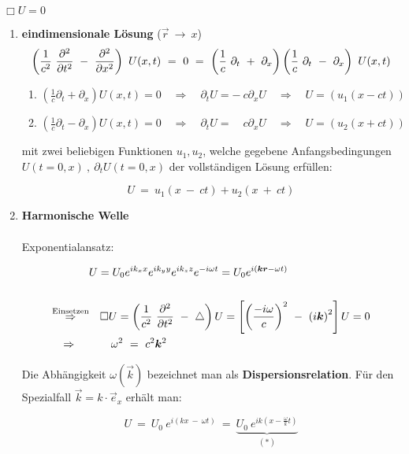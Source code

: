$\Box U = 0$

\begin{enumerate}[label=\textbf{\arabic* .}]
\item \textbf{eindimensionale Lösung} ($\vec{r}\  \rightarrow \ x$)
\begin{equation*}
\left(\frac{1}{c^2} \ \pddiff{}{t} \ - \ \pddiff{}{x}\right)\ U(x,t) \ = \ 0 \ = \ \left(\frac{1}{c}\ \partial_t \ + \ \partial_x\right)\left(\frac{1}{c} \ \partial_t \ - \ \partial_x\right) \ U(x,t)
\end{equation*}

\begin{enumerate}
\item $\left(\frac{1}{c}\partial_t+\partial_x\right)U(x,t) = 0 \quad\Rightarrow\quad \partial_t U = - \ c \partial_x U \quad\Rightarrow\quad U = (u_1(x-ct))$
\item $\left(\frac{1}{c}\partial_t-\partial_x\right)U(x,t) = 0 \quad\Rightarrow\quad \partial_t U =\quad c \partial_x U \quad\Rightarrow\quad U = (u_2(x+ct))$
\end{enumerate}

mit zwei beliebigen Funktionen $u_1,u_2$, welche gegebene Anfangsbedingungen $U(t=0,x) \ , \ \partial_t U(t=0,x)$ der vollständigen Lösung erfüllen:

\begin{equation*}
U \ = \ u_1(x\ -\ ct) + u_2(x\ +\ ct)
\end{equation*}

\item
\textbf{Harmonische Welle}\\
\ \\
Exponentialansatz:

\begin{align*}
& U=U_0 e^{ik_x x}e^{ik_y y}e^{ik_z z}e^{-i\omega t} = U_0 e^{i(\vec{k}\vec{r}-\omega
t)}\\
\ \\
\overset{\text{Einsetzen}}{\Rightarrow} &\quad\Box U = \left(\frac{1}{c^2} \ \pddiff{}{t} \ - \ \bigtriangleup\right)U = \left[\left(\frac{-i\omega}{c}\right)^2 \ - \ \left(i\vec{k}\right)^2\right]U = 0\\
\Rightarrow \ \quad&\qquad \omega^2 \ = \ c^2 \vec{k}^2
\end{align*}

Die Abhängigkeit $\omega(\vec{k})$ bezeichnet man als \textbf{Dispersionsrelation}. Für den Spezialfall $\vec{k} = k \cdot \vec{e}_x$ erhält man:

\begin{equation*}
U \ = \ U_0 \ e^{i(kx \ - \ \omega t)} \ = \ \underbrace{U_0 \ e^{ik\left(x-\frac{\omega}{k}t\right)} }_{(*)}
\end{equation*}


\end{enumerate}
